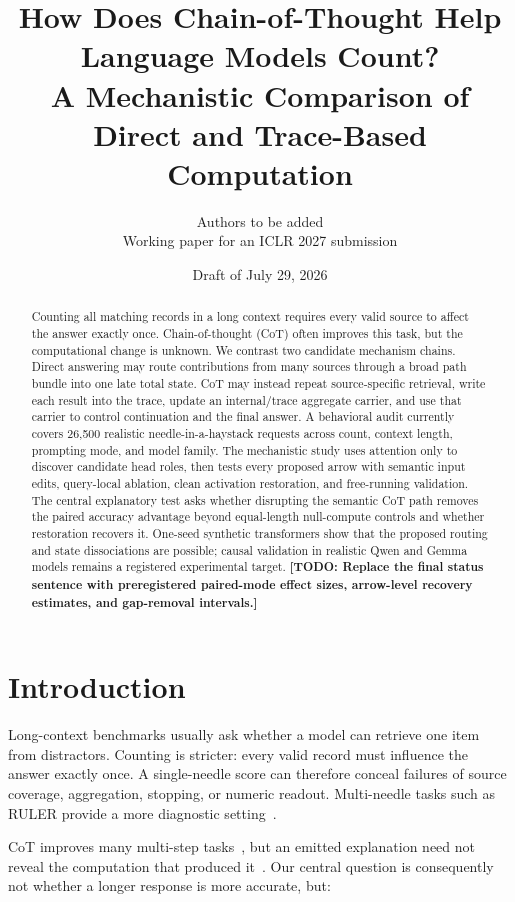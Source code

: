 \documentclass[11pt]{article}
\title{How Does Chain-of-Thought Help Language Models Count?\\
A Mechanistic Comparison of Direct and Trace-Based Computation}
\author{Authors to be added\\\small Working paper for an ICLR 2027 submission}
\date{Draft of July 29, 2026}
\newcommand{\inlineTODO}[1]{\textcolor{todored}{\textbf{[TODO: #1]}}}
\begin{document}
\maketitle

\begin{abstract}
Counting all matching records in a long context requires every valid source to affect the answer exactly once. Chain-of-thought (CoT) often improves this task, but the computational change is unknown. We contrast two candidate mechanism chains. Direct answering may route contributions from many sources through a broad path bundle into one late total state. CoT may instead repeat source-specific retrieval, write each result into the trace, update an internal/trace aggregate carrier, and use that carrier to control continuation and the final answer. A behavioral audit currently covers 26,500 realistic needle-in-a-haystack requests across count, context length, prompting mode, and model family. The mechanistic study uses attention only to discover candidate head roles, then tests every proposed arrow with semantic input edits, query-local ablation, clean activation restoration, and free-running validation. The central explanatory test asks whether disrupting the semantic CoT path removes the paired accuracy advantage beyond equal-length null-compute controls and whether restoration recovers it. One-seed synthetic transformers show that the proposed routing and state dissociations are possible; causal validation in realistic Qwen and Gemma models remains a registered experimental target. \inlineTODO{Replace the final status sentence with preregistered paired-mode effect sizes, arrow-level recovery estimates, and gap-removal intervals.}
\end{abstract}

\section{Introduction}

Long-context benchmarks usually ask whether a model can retrieve one item from distractors. Counting is stricter: every valid record must influence the answer exactly once. A single-needle score can therefore conceal failures of source coverage, aggregation, stopping, or numeric readout. Multi-needle tasks such as RULER provide a more diagnostic setting~\citep{hsieh2024ruler}.

CoT improves many multi-step tasks~\citep{wei2022cot}, but an emitted explanation need not reveal the computation that produced it~\citep{turpin2023unfaithful}. Our central question is consequently not whether a longer response is more accurate, but:
\end{document}
